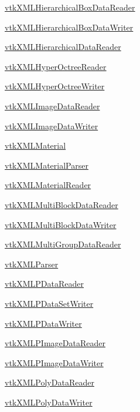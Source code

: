 \begin{DoxyItemize}
\item \hyperlink{vtkio_vtkxmlhierarchicalboxdatareader}{vtk\-X\-M\-L\-Hierarchical\-Box\-Data\-Reader}  
\item \hyperlink{vtkio_vtkxmlhierarchicalboxdatawriter}{vtk\-X\-M\-L\-Hierarchical\-Box\-Data\-Writer}  
\item \hyperlink{vtkio_vtkxmlhierarchicaldatareader}{vtk\-X\-M\-L\-Hierarchical\-Data\-Reader}  
\item \hyperlink{vtkio_vtkxmlhyperoctreereader}{vtk\-X\-M\-L\-Hyper\-Octree\-Reader}  
\item \hyperlink{vtkio_vtkxmlhyperoctreewriter}{vtk\-X\-M\-L\-Hyper\-Octree\-Writer}  
\item \hyperlink{vtkio_vtkxmlimagedatareader}{vtk\-X\-M\-L\-Image\-Data\-Reader}  
\item \hyperlink{vtkio_vtkxmlimagedatawriter}{vtk\-X\-M\-L\-Image\-Data\-Writer}  
\item \hyperlink{vtkio_vtkxmlmaterial}{vtk\-X\-M\-L\-Material}  
\item \hyperlink{vtkio_vtkxmlmaterialparser}{vtk\-X\-M\-L\-Material\-Parser}  
\item \hyperlink{vtkio_vtkxmlmaterialreader}{vtk\-X\-M\-L\-Material\-Reader}  
\item \hyperlink{vtkio_vtkxmlmultiblockdatareader}{vtk\-X\-M\-L\-Multi\-Block\-Data\-Reader}  
\item \hyperlink{vtkio_vtkxmlmultiblockdatawriter}{vtk\-X\-M\-L\-Multi\-Block\-Data\-Writer}  
\item \hyperlink{vtkio_vtkxmlmultigroupdatareader}{vtk\-X\-M\-L\-Multi\-Group\-Data\-Reader}  
\item \hyperlink{vtkio_vtkxmlparser}{vtk\-X\-M\-L\-Parser}  
\item \hyperlink{vtkio_vtkxmlpdatareader}{vtk\-X\-M\-L\-P\-Data\-Reader}  
\item \hyperlink{vtkio_vtkxmlpdatasetwriter}{vtk\-X\-M\-L\-P\-Data\-Set\-Writer}  
\item \hyperlink{vtkio_vtkxmlpdatawriter}{vtk\-X\-M\-L\-P\-Data\-Writer}  
\item \hyperlink{vtkio_vtkxmlpimagedatareader}{vtk\-X\-M\-L\-P\-Image\-Data\-Reader}  
\item \hyperlink{vtkio_vtkxmlpimagedatawriter}{vtk\-X\-M\-L\-P\-Image\-Data\-Writer}  
\item \hyperlink{vtkio_vtkxmlpolydatareader}{vtk\-X\-M\-L\-Poly\-Data\-Reader}  
\item \hyperlink{vtkio_vtkxmlpolydatawriter}{vtk\-X\-M\-L\-Poly\-Data\-Writer}  

\end{DoxyItemize}
